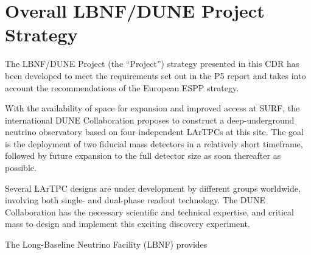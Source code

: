 \section{Overall LBNF/DUNE Project Strategy} %

The LBNF/DUNE Project (the ``Project'') strategy presented in this CDR has been developed to meet the requirements 
set out in the P5 report and %
takes into account the recommendations of the European 
ESPP strategy.


With the availability of space for expansion and improved access at SURF, %
the international DUNE Collaboration proposes to construct a deep-underground neutrino observatory based on four independent  LArTPCs at this site. %
The goal is the deployment of two  fiducial mass detectors in a relatively short timeframe, followed by future expansion to the full detector size as soon thereafter as possible. 

Several LArTPC designs are under development by different groups worldwide, involving both single- and dual-phase readout technology.
The DUNE %
Collaboration  has the necessary scientific and technical expertise, %
and critical mass   to design and implement this exciting discovery experiment. 

The Long-Baseline Neutrino Facility (LBNF) provides

